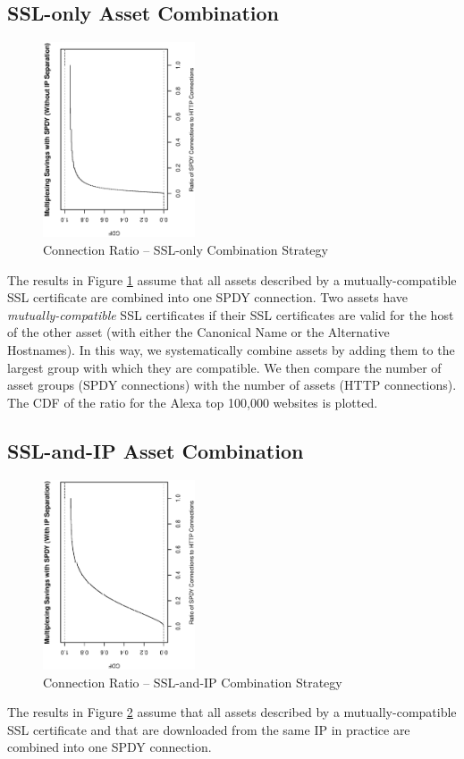 \documentclass[11pt,letterpaper,notitlepage]{article}
\begin{document}
\subsection{SSL-only Asset Combination}
\begin{figure}[h!]
\includegraphics[width=0.4\textwidth,angle=270]{plots/asset_combination_only_ssl_ratio.eps}
\caption{Connection Ratio -- SSL-only Combination Strategy}
\label{fig:combination-ssl}
\end{figure}
The results in Figure \ref{fig:combination-ssl} assume that all assets
described by a mutually-compatible SSL certificate are combined into one SPDY
connection. Two assets have \textit{mutually-compatible} SSL certificates if
their SSL certificates are valid for the host of the other asset (with either
the Canonical Name or the Alternative Hostnames). In this way, we
systematically combine assets by adding them to the largest group with which
they are compatible. We then compare the number of asset groups (SPDY
connections) with the number of assets (HTTP connections). The CDF of the ratio
for the Alexa top 100,000 websites is plotted.

\subsection{SSL-and-IP Asset Combination}
\begin{figure}[h!]
\includegraphics[width=0.4\textwidth,angle=270]{plots/asset_combination_ssl_and_ip_ratio.eps}
\caption{Connection Ratio -- SSL-and-IP Combination Strategy}
\label{fig:combination-ssl-and-ip}
\end{figure}
The results in Figure \ref{fig:combination-ssl-and-ip} assume that all assets
described by a mutually-compatible SSL certificate and that are downloaded from
the same IP in practice are combined into one SPDY connection.
\end{document}
